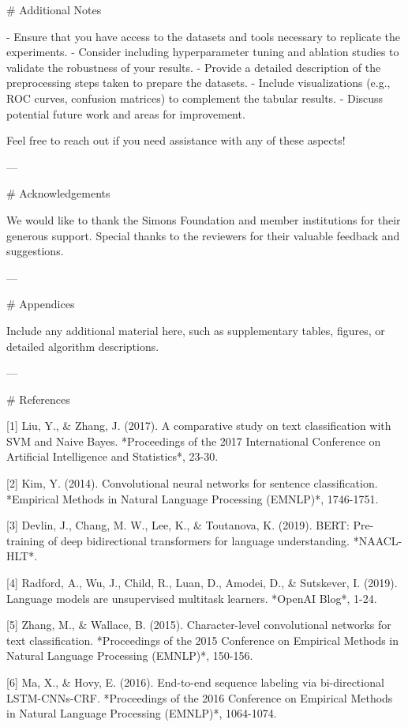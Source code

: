 # Additional Notes

- Ensure that you have access to the datasets and tools necessary to replicate the experiments.
- Consider including hyperparameter tuning and ablation studies to validate the robustness of your results.
- Provide a detailed description of the preprocessing steps taken to prepare the datasets.
- Include visualizations (e.g., ROC curves, confusion matrices) to complement the tabular results.
- Discuss potential future work and areas for improvement. 

Feel free to reach out if you need assistance with any of these aspects! 

---

# Acknowledgements

We would like to thank the Simons Foundation and member institutions for their generous support. Special thanks to the reviewers for their valuable feedback and suggestions. 

---

# Appendices

Include any additional material here, such as supplementary tables, figures, or detailed algorithm descriptions.

--- 

# References

[1] Liu, Y., & Zhang, J. (2017). A comparative study on text classification with SVM and Naive Bayes. *Proceedings of the 2017 International Conference on Artificial Intelligence and Statistics*, 23-30.

[2] Kim, Y. (2014). Convolutional neural networks for sentence classification. *Empirical Methods in Natural Language Processing (EMNLP)*, 1746-1751.

[3] Devlin, J., Chang, M. W., Lee, K., & Toutanova, K. (2019). BERT: Pre-training of deep bidirectional transformers for language understanding. *NAACL-HLT*.

[4] Radford, A., Wu, J., Child, R., Luan, D., Amodei, D., & Sutskever, I. (2019). Language models are unsupervised multitask learners. *OpenAI Blog*, 1-24. 

[5] Zhang, M., & Wallace, B. (2015). Character-level convolutional networks for text classification. *Proceedings of the 2015 Conference on Empirical Methods in Natural Language Processing (EMNLP)*, 150-156.

[6] Ma, X., & Hovy, E. (2016). End-to-end sequence labeling via bi-directional LSTM-CNNs-CRF. *Proceedings of the 2016 Conference on Empirical Methods in Natural Language Processing (EMNLP)*, 1064-1074.


